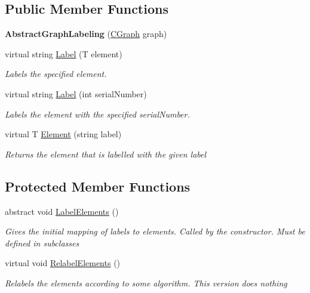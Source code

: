 \subsection*{Public Member Functions}
\begin{DoxyCompactItemize}
\item 
\hypertarget{class_graph_library_1_1_abstract_graph_labeling_ad93f87ff155880c3666c1da9541a4766}{}{\bfseries Abstract\+Graph\+Labeling} (\hyperlink{class_graph_library_1_1_c_graph}{C\+Graph} graph)\label{class_graph_library_1_1_abstract_graph_labeling_ad93f87ff155880c3666c1da9541a4766}

\item 
virtual string \hyperlink{class_graph_library_1_1_abstract_graph_labeling_a496a92bed9a3b4719d6b8305c8faa7fc}{Label} (T element)
\begin{DoxyCompactList}\small\item\em Labels the specified element. \end{DoxyCompactList}\item 
virtual string \hyperlink{class_graph_library_1_1_abstract_graph_labeling_a88b33d453be1ca7b7625c9cb253fdd3a}{Label} (int serial\+Number)
\begin{DoxyCompactList}\small\item\em Labels the element with the specified serial\+Number. \end{DoxyCompactList}\item 
virtual T \hyperlink{class_graph_library_1_1_abstract_graph_labeling_afee7a68424e1db807c738f9c0647200c}{Element} (string label)
\begin{DoxyCompactList}\small\item\em Returns the element that is labelled with the given label \end{DoxyCompactList}\end{DoxyCompactItemize}
\subsection*{Protected Member Functions}
\begin{DoxyCompactItemize}
\item 
abstract void \hyperlink{class_graph_library_1_1_abstract_graph_labeling_affb3beda64dae20ffc9cdce8dd39e5b4}{Label\+Elements} ()
\begin{DoxyCompactList}\small\item\em Gives the initial mapping of labels to elements. Called by the constructor. Must be defined in subclasses \end{DoxyCompactList}\item 
virtual void \hyperlink{class_graph_library_1_1_abstract_graph_labeling_ab10cb68784faa04dffb774dd76d709b8}{Relabel\+Elements} ()
\begin{DoxyCompactList}\small\item\em Relabels the elements according to some algorithm. This version does nothing \end{DoxyCompactList}\end{DoxyCompactItemize}
